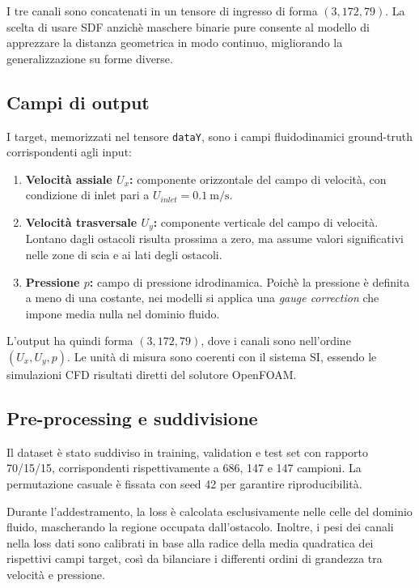 \documentclass[final,3p,times]{elsarticle}
\begin{document}
I tre canali sono concatenati in un tensore di ingresso di forma $(3, 172, 79)$. La scelta di usare SDF anzich\`e maschere binarie pure consente al modello di apprezzare la distanza geometrica in modo continuo, migliorando la generalizzazione su forme diverse.

\subsection{Campi di output}\label{subsec:output}
I target, memorizzati nel tensore \texttt{dataY}, sono i campi fluidodinamici ground-truth corrispondenti agli input:
\begin{enumerate}
    \item \textbf{Velocit\`a assiale $U_x$:} componente orizzontale del campo di velocit\`a, con condizione di inlet pari a $U_{inlet} = \SI{0.1}{\meter\per\second}$.
    \item \textbf{Velocit\`a trasversale $U_y$:} componente verticale del campo di velocit\`a. Lontano dagli ostacoli risulta prossima a zero, ma assume valori significativi nelle zone di scia e ai lati degli ostacoli.
    \item \textbf{Pressione $p$:} campo di pressione idrodinamica. Poich\`e la pressione \`e definita a meno di una costante, nei modelli si applica una \emph{gauge correction} che impone media nulla nel dominio fluido.
\end{enumerate}

L'output ha quindi forma $(3, 172, 79)$, dove i canali sono nell'ordine $(U_x, U_y, p)$. Le unit\`a di misura sono coerenti con il sistema SI, essendo le simulazioni CFD risultati diretti del solutore OpenFOAM.

\subsection{Pre-processing e suddivisione}
Il dataset \`e stato suddiviso in training, validation e test set con rapporto 70/15/15, corrispondenti rispettivamente a 686, 147 e 147 campioni. La permutazione casuale \`e fissata con seed 42 per garantire riproducibilit\`a.

Durante l'addestramento, la loss \`e calcolata esclusivamente nelle celle del dominio fluido, mascherando la regione occupata dall'ostacolo. Inoltre, i pesi dei canali nella loss dati sono calibrati in base alla radice della media quadratica dei rispettivi campi target, cos\`i da bilanciare i differenti ordini di grandezza tra velocit\`a e pressione.
\end{document}

